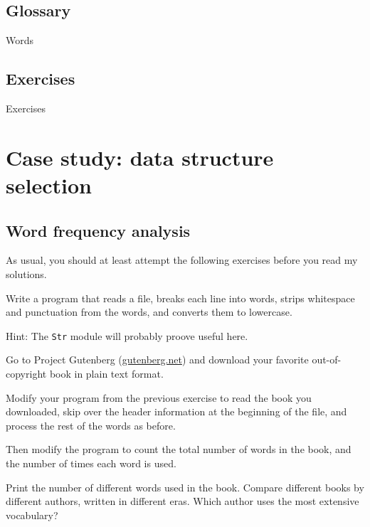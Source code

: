 \documentclass[10pt]{book}
\begin{document}
\section{Glossary}

Words

\section{Exercises}

Exercises


\chapter{Case study: data structure selection}

\section{Word frequency analysis}
\label{analysis}

As usual, you should at least attempt the following exercises
before you read my solutions.

\begin{ex}
Write a program that reads a file, breaks each line into
words, strips whitespace and punctuation from the words, and
converts them to lowercase.


Hint: The {\tt Str} module will probably proove useful here.
\end{ex}


\begin{ex}


Go to Project Gutenberg (\url{gutenberg.net}) and download 
your favorite out-of-copyright book in plain text format.


Modify your program from the previous exercise to read the book
you downloaded, skip over the header information at the beginning
of the file, and process the rest of the words as before.

Then modify the program to count the total number of words in
the book, and the number of times each word is used.


Print the number of different words used in the book.  Compare
different books by different authors, written in different eras.
Which author uses the most extensive vocabulary?
\end{ex}
\end{document}
